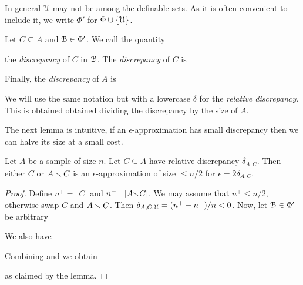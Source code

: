 \documentclass[sputnik.tex]{subfiles}
\begin{document}
In general $\EuScript U$ may not be among the definable sets. As it is often convenient to include it, we write \emph{$\Phi'$\/} for $\Phi\cup\{\EuScript U\}$.

Let $C\subseteq A$ and $\EuScript B\in\Phi'$. We call the quantity 


the \emph{discrepancy\/} of $C$ in $\EuScript B$. 
The \emph{discrepancy\/} of $C$ is


Finally, the \emph{discrepancy\/} of $A$ is 


We will use the same notation but with a lowercase \emph{$\delta$\/} for the \emph{relative discrepancy}. This is obtained obtained dividing the discrepancy by the size of $A$.

The next lemma is intuitive, if an $\epsilon$-approximation has small discrepancy then we can halve its size at a small cost.

\begin{lemma}\label{lem_aprossimazionediapprossimazione}
Let $A$ be a sample of size $n$.
Let $C\subseteq A$ have relative discrepancy $\delta_{A,C}$.
Then either $C$ or $A\smallsetminus C$ is an $\epsilon$-approximation of size $\le n/2$ for $\epsilon=2\delta_{A,C}$.
\end{lemma}

\begin{proof}

Define $n^+{=}\,|C|$ and  $n^-{=}\,|A{\smallsetminus}C|$.
We may assume that $n^+\le n/2$, otherwise swap $C$ and $A\smallsetminus C$.
Then $\delta_{A,C,\EuScript U}=(n^+-n^-)/n<0$. Now, let $\EuScript B\in\Phi'$ be arbitrary




We also have 



Combining  and  we obtain\smallskip


\smallskip

as claimed by the lemma.
\end{proof}
\end{document}
